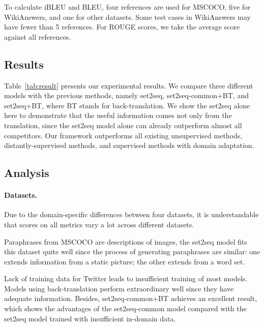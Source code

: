 To calculate iBLEU and BLEU, four references are used for MSCOCO, 
five for WikiAnswers, and one for other datasets. Some test cases in 
WikiAnswers may have fewer than 5 references. 
For ROUGE scores, we take the average score against all references.

\subsection{Results} \label{sec:result}

Table~\ref{tab:result} presents our experimental results. We compare three different models with the previous methods, 
namely set2seq, set2seq-common+BT, and set2seq+BT, where BT stands for 
back-translation. We show the set2seq alone here to demonstrate that
the useful information comes not only from the translation, since the
set2seq model alone can already outperform almost all competitors. 
Our framework outperforms all existing unsupervised methods, 
distantly-supervised methods, and supervised methods with domain adaptation.

\subsection{Analysis} \label{sec:analysis}
\paragraph{Datasets. } Due to the domain-specific differences between four datasets, it is understandable that scores on all metrics vary a lot across different datasets. 

Paraphrases from MSCOCO are descriptions of images, the set2seq model fits this dataset quite well since the process of generating paraphrases are similar: 
one extends information from a static picture; 
the other extends from a word set. 

Lack of training data for Twitter leads to insufficient training of most models.
Models using back-translation perform extraordinary well since they have 
adequate information. Besides, set2seq-common+BT achieves an excellent result, 
which shows the advantages of the set2seq-common model compared with the 
set2seq model trained with insufficient in-domain data.

